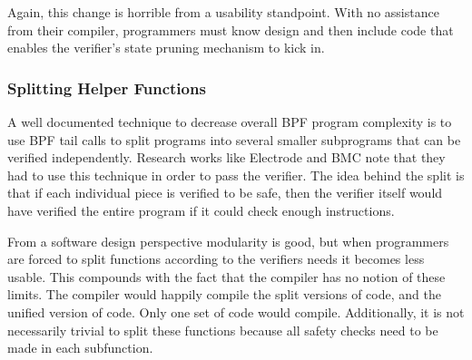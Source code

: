Again, this change is horrible from a usability standpoint.
With no assistance from their compiler, programmers must know design and then include code that enables the verifier's state pruning mechanism to kick in.

\subsubsection{Splitting Helper Functions}
A well documented technique to decrease overall BPF program complexity is to use BPF tail calls to split programs into several smaller subprograms that can be verified independently.
Research works like Electrode and BMC note that they had to use this technique in order to pass the verifier.
The idea behind the split is that if each individual piece is verified to be safe, then the verifier itself would have verified the entire program if it could check enough instructions.

From a software design perspective modularity is good, but when programmers are forced to split functions according to the verifiers needs it becomes less usable.
This compounds with the fact that the compiler has no notion of these limits.
The compiler would happily compile the split versions of code, and the unified version of code.
Only one set of code would compile.
Additionally, it is not necessarily trivial to split these functions because all safety checks need to be made in each subfunction.
